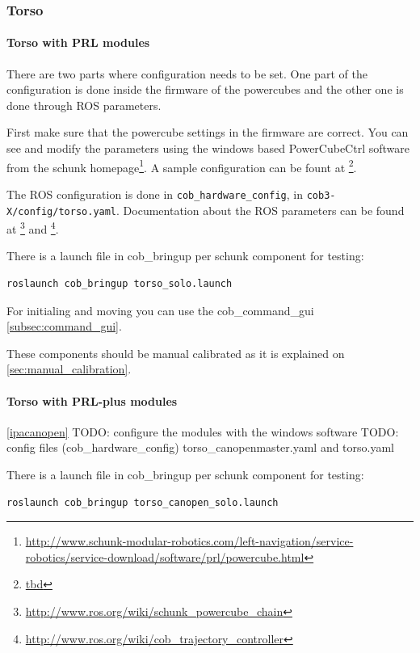 \subsubsection{Torso}
\paragraph{Torso with PRL modules}
There are two parts where configuration needs to be set. One part of the configuration is done inside the firmware of the powercubes and the other one is done through ROS parameters.

First make sure that the powercube settings in the firmware are correct. You can see and modify the parameters using the windows based PowerCubeCtrl software from the schunk homepage\footnote{\url{http://www.schunk-modular-robotics.com/left-navigation/service-robotics/service-download/software/prl/powercube.html}}. A sample configuration can be fount at \footnote{\url{tbd}}.

The ROS configuration is done in \texttt{cob\_hardware\_config}, in \texttt{cob3-X/config/torso.yaml}. Documentation about the ROS parameters can be found at \footnote{\url{http://www.ros.org/wiki/schunk_powercube_chain}} and \footnote{\url{http://www.ros.org/wiki/cob_trajectory_controller}}.

There is a launch file in cob\_bringup per schunk component for testing:

\begin{lstlisting}
roslaunch cob_bringup torso_solo.launch
\end{lstlisting}

For initialing and moving you can use the cob\_command\_gui \ref{subsec:command_gui}.

These components should be manual calibrated as it is explained on \ref{sec:manual_calibration}.

\paragraph{Torso with PRL-plus modules}
\ref{ipacanopen}
TODO: configure the modules with the windows software
TODO: config files (cob\_hardware\_config)  torso\_canopenmaster.yaml and torso.yaml


There is a launch file in cob\_bringup per schunk component for testing:

\begin{lstlisting}
roslaunch cob_bringup torso_canopen_solo.launch
\end{lstlisting}

